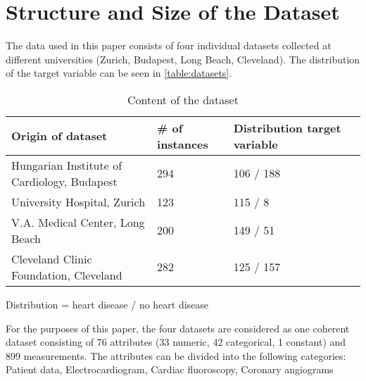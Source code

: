 \section{Structure and Size of the Dataset} \label{sec:dataUnderstanding}


The data used in this paper consists of four individual datasets collected at different universities (Zurich, Budapest, Long Beach, Cleveland). The distribution of the target variable can be seen in \vref{table:datasets}.
\begin{table}[h]

    \begin{footnotesize}
        \begin{tabular}{|l|l|l|l|}
            \hline
            \textbf{Origin of dataset}              & \textbf{\# of instances} & \textbf{Distribution target variable} \\ \hline
            Hungarian Institute of Cardiology, Budapest & 294                      & 106 / 188                             \\ \hline
            University Hospital, Zurich                 & 123                      & 115 / 8                               \\ \hline
            V.A. Medical Center, Long Beach             & 200                      & 149 / 51                              \\ \hline
            Cleveland Clinic Foundation, Cleveland      & 282                      & 125 / 157                             \\ \hline
        \end{tabular}
    \end{footnotesize}
    \begin{center}
        \centering
        Distribution = heart disease / no heart disease
    \end{center}
    \caption{Content of the dataset}
    \label{table:datasets}
\end{table}



For the purposes of this paper, the four datasets are considered as one coherent dataset consisting of 76 attributes (33 numeric, 42 categorical, 1 constant) and 899 measurements.
The attributes can be divided into the following categories: Patient data, Electrocardiogram, Cardiac fluoroscopy, Coronary angiograms


